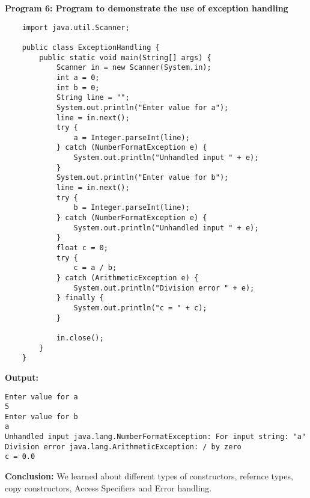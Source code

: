 \documentclass{book}
\begin{document}
\par
\textbf{Program 6: Program to demonstrate the use of exception handling}
\begin{verbatim}
    import java.util.Scanner;

    public class ExceptionHandling {
        public static void main(String[] args) {
            Scanner in = new Scanner(System.in);
            int a = 0;
            int b = 0;
            String line = "";
            System.out.println("Enter value for a");
            line = in.next();
            try {
                a = Integer.parseInt(line);
            } catch (NumberFormatException e) {
                System.out.println("Unhandled input " + e);
            }
            System.out.println("Enter value for b");
            line = in.next();
            try {
                b = Integer.parseInt(line);
            } catch (NumberFormatException e) {
                System.out.println("Unhandled input " + e);
            }
            float c = 0;
            try {
                c = a / b;
            } catch (ArithmeticException e) {
                System.out.println("Division error " + e);
            } finally {
                System.out.println("c = " + c);
            }

            in.close();
        }
    }
\end{verbatim}
\par
\textbf{Output:}
\begin{verbatim}
Enter value for a
5
Enter value for b
a
Unhandled input java.lang.NumberFormatException: For input string: "a"
Division error java.lang.ArithmeticException: / by zero
c = 0.0
\end{verbatim}
\par
\textbf{Conclusion:} We learned about different types of constructors, refernce types, copy constructors, Access Specifiers and Error handling.
\end{document}
